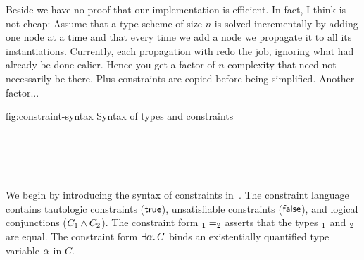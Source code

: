 \documentclass[acmsmall,screen,nonacm]{acmart}
\begin{document}
\Xdidier
{Beside we have no proof that our implementation is efficient. In fact, I
think is not cheap: Assume that a type scheme of size $n$ is solved
incrementally by adding one node at a time and that every time we add a node
we propagate it to all its instantiations. Currently, each propagation with
redo the job, ignoring what had already be done ealier. Hence you get a
factor of $n$ complexity that need not necessarily be there. Plus
constraints are copied before being simplified. Another factor...}

\begin{bnffig}[t]%
  {fig:constraint-syntax}%
  {Syntax of types and constraints}
\\
\\
\\
\\
\entry[Shapes] \sh {\tvs \F \and \ldots}
\\
\entry \D {\eset \and \D, \tv \and \D, \x}
\end{bnffig}


We begin by introducing the syntax of constraints
in~.  The constraint language contains
tautologic constraints ($\mathsf{true}$), unsatisfiable constraints ($\mathsf{false}$),
and logical conjunctions ($C_1 \wedge C_2$). The constraint form $\relax_1 =
\relax_2$ asserts that the types $\relax_1$ and $\relax_2$ are equal.  The constraint
form $\exists {\alpha}.\, C$ binds an existentially quantified type variable $\alpha$
in $C$.

\end{document}
